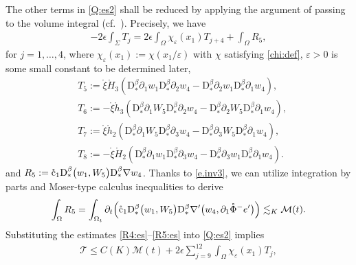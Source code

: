 \documentclass[twoside,11pt]{article}
\numberwithin{equation}{section}
\def\p{\partial}
\begin{document}
The other terms in \eqref{Q:es2} shall be reduced by applying the argument of passing to the volume integral (cf.~\cite[pp.~273--274]{T09ARMAMR2481071}).
Precisely, we have
\begin{align}
	-2\epsilon   \int_{\Sigma} T_j
	=2\epsilon \int_{\Omega} \chi_{\varepsilon}(x_1)T_{j+4}+\int_{\Omega}R_5,
	\label{Q:es3}
\end{align}
for $j=1,\ldots,4$,
where
$\chi_{\varepsilon}(x_1):=\chi(x_1/\varepsilon)$
with $\chi$ satisfying \eqref{chi:def},
$\varepsilon>0$ is some small constant to be determined later,
\begin{align*}
	&T_5:= {\mathring{\xi}\mathring{H}_3} \left(\mathrm{D}_*^{\beta}\p_1 w_1  	\mathrm{D}_*^{\beta} \p_2{w_4}	 -  \mathrm{D}_*^{\beta} \p_2w_1  	\mathrm{D}_*^{\beta} \p_1{w_4}\right),\\[1mm]
	&T_6:= -{\mathring{\xi}\mathring{h}_3} \left(\mathrm{D}_*^{\beta}\p_1 W_5	\mathrm{D}_*^{\beta} \p_2{w_4}	 -  \mathrm{D}_*^{\beta} \p_2W_5	\mathrm{D}_*^{\beta} \p_1{w_4}\right),\\[1mm]
	&T_7:= {\mathring{\xi}\mathring{h}_2} \left(\mathrm{D}_*^{\beta}\p_1 W_5  	\mathrm{D}_*^{\beta} \p_3{w_4}	 -  \mathrm{D}_*^{\beta} \p_3W_5  	\mathrm{D}_*^{\beta} \p_1{w_4}\right),\\[1mm]
	&T_8:=- {\mathring{\xi}\mathring{H}_2} \left(\mathrm{D}_*^{\beta}\p_1 w_1  	\mathrm{D}_*^{\beta} \p_3{w_4}	 -  \mathrm{D}_*^{\beta} \p_3w_1  	\mathrm{D}_*^{\beta} \p_1{w_4}\right).
\end{align*}
and $R_5:= \mathring{\rm c}_1\mathrm{D}_*^{\beta}\big(w_1, W_5\big)\mathrm{D}_*^{\beta}\nabla{w_4}$.
Thanks to \eqref{e.inv3}, we can utilize integration by parts and Moser-type calculus inequalities to derive %
\begin{align}
	\int_{\Omega}R_5
=\int_{\Omega_t}\p_t \Big(\mathring{\rm c}_1\mathrm{D}_*^{\beta}\big(w_1, W_5\big)\mathrm{D}_*^{\beta}\nabla'\big({w_4}, \p_1\mathring{\Phi}^{-}e'\big)\Big)
\lesssim_K \mathcal{M}(t). \label{R5:es}
\end{align}
Substituting the estimates \eqref{R4:es}--\eqref{R5:es} into \eqref{Q:es2} implies
\begin{align} \label{Q:es4}
	\mathcal{T}	\leq C(K)\mathcal{M}(t)+	2\epsilon \sum_{j=9}^{12} \int_{\Omega} \chi_{\varepsilon}(x_1)T_j,
\end{align}
\end{document}
